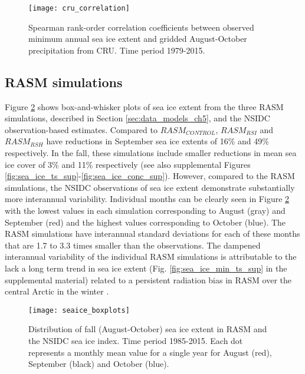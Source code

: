 \begin{figure}
  \centering
  \texttt{[image: cru\_correlation]}
  \caption{Spearman rank-order correlation coefficients between observed minimum annual sea ice extent and gridded August-October precipitation from CRU. Time period 1979-2015.}
  \label{fig:prec_spatial_corr}
\end{figure}

\subsection{RASM simulations}
\label{sec:rasm_results}

Figure \ref{fig:sea_ice_box} shows box-and-whisker plots of sea ice extent from the three RASM simulations, described in Section \ref{sec:data_models_ch5}, and the NSIDC observation-based estimates.
Compared to $RASM_{CONTROL}$, $RASM_{RSI}$ and $RASM_{RSH}$ have reductions in September sea ice extents of 16\% and 49\% respectively.
In the fall, these simulations include smaller reductions in mean sea ice cover of 3\% and 11\% respectively (see also supplemental Figures \ref{fig:sea_ice_ts_sup}-\ref{fig:sea_ice_conc_sup}).
However, compared to the RASM simulations, the NSIDC observations of sea ice extent demonstrate substantially more interannual variability.
Individual months can be clearly seen in Figure \ref{fig:sea_ice_box} with the lowest values in each simulation corresponding to August (gray) and September (red) and the highest values corresponding to October (blue).
The RASM simulations have interannual standard deviations for each of these months that are 1.7 to 3.3 times smaller than the observations.
The dampened interannual variability of the individual RASM simulations is attributable to the lack a long term trend in sea ice extent (Fig. \ref{fig:sea_ice_min_ts_sup} in the supplemental material) related to a persistent radiation bias in RASM over the central Arctic in the winter \citep{Cassano_2016}.

\begin{figure}
  \centering
  \texttt{[image: seaice\_boxplots]}
  \caption{Distribution of fall (August-October) sea ice extent in RASM and the NSIDC sea ice index. Time period 1985-2015. Each dot represents a monthly mean value for a single year for August (red), September (black) and October (blue).}
  \label{fig:sea_ice_box}
\end{figure}

